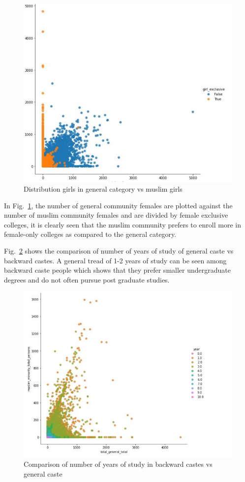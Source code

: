 \begin{figure}[h]
\centerline{\includegraphics[scale=0.6]{figures/girls_general.jpg}}
\caption{Distribution girls in general category vs muslim girls}
\label{girls}
\end{figure}

In Fig.~\ref{girls}, the number of general community females are plotted against the number of muslim community females and are divided by female exclusive colleges, it is clearly seen that the muslim community prefers to enroll more in female-only colleges as compared to the general category.

Fig.~\ref{study_years} shows the comparison of number of years of study of general caste vs backward castes. A general tread of 1-2 years of study can be seen among backward caste people which shows that they prefer smaller undergraduate degrees and do not often pursue post graduate studies.

\begin{figure}[h]
\centerline{\includegraphics[scale=0.6]{figures/years_study.jpg}}
\caption{Comparison of number of years of study in backward castes vs general caste}
\label{study_years}
\end{figure}

